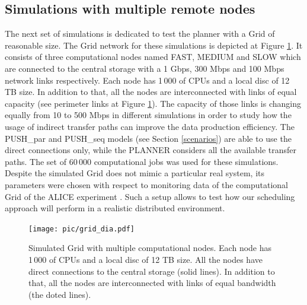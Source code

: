 \documentclass{svjour3}                     %
\begin{document}
\subsection{Simulations with multiple remote nodes}
\label{3nodesSim}
The next set of simulations is dedicated to test the planner with a Grid of reasonable size. The Grid network for these simulations is depicted at Figure \ref{simulated_grid}. It consists of three computational nodes named FAST, MEDIUM and SLOW which are connected to the central storage with a 1 Gbps, 300 Mbps and 100 Mbps network links respectively. Each node has 1\,000 of CPUs and a local disc of 12 TB size. In addition to that, all the nodes are interconnected with links of equal capacity (see perimeter links at Figure \ref{simulated_grid}). The capacity of those links is changing equally from 10 to 500 Mbps in different simulations in order to study how the usage of indirect transfer paths can improve the data production efficiency. The PUSH\_par and PUSH\_seq models (see Section \ref{scenarios}) are able to use the direct connections only, while the PLANNER considers all the available transfer paths. The set of 60\,000 computational jobs was used for these simulations.
Despite the simulated Grid does not mimic a particular real system, its parameters were chosen with respect to monitoring data of the computational Grid of the ALICE experiment \cite{MonAlisa}. Such a setup allows to test how our scheduling approach will perform in a realistic distributed environment. 
\begin{figure}
  \begin{center}
    \texttt{[image: pic/grid\_dia.pdf]}
    \caption{Simulated Grid with multiple computational nodes. Each node has 1\,000 of CPUs and a local disc of 12 TB size. All the nodes have direct connections to the central storage (solid lines). In addition to that, all the nodes are interconnected with links of equal bandwidth (the doted lines).}
    \label{simulated_grid}	
  \end{center}  
\end{figure}
\end{document}
